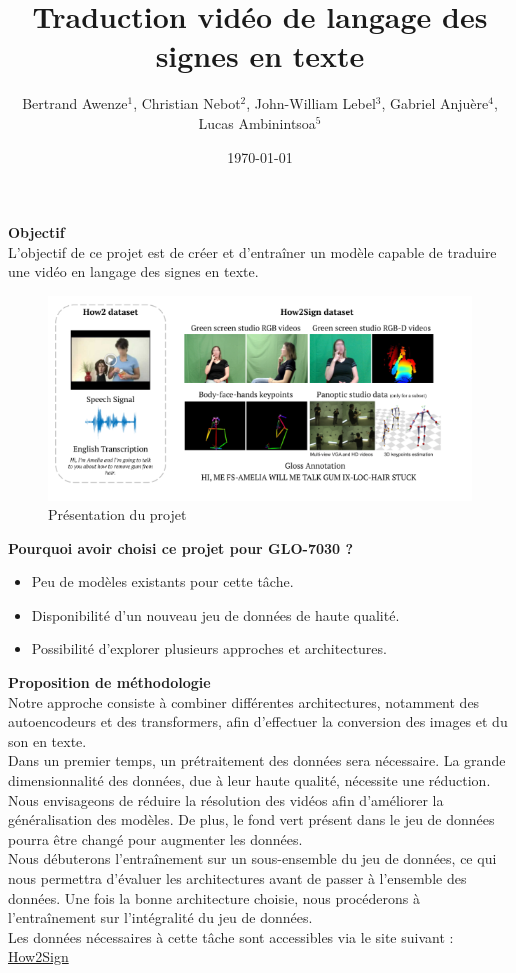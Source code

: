 \documentclass{article}
\title{\textbf{Traduction vidéo de langage des signes en texte}}
\author{
    Bertrand Awenze$^{1}$, Christian Nebot$^{2}$, John-William Lebel$^{3}$, Gabriel Anjuère$^{4}$, Lucas Ambinintsoa$^{5}$
}
\affil[ ]{$^{1,3}$ GLO-4030 \quad $^{2,4,5}$ GLO-7030}
\date{\today}
\begin{document}
\maketitle

\noindent
\textbf{Objectif} \\

L’objectif de ce projet est de créer et d’entraîner un modèle capable de traduire une vidéo en langage des signes en texte.\\ 

\begin{figure}[h]
    \centering
    \includegraphics[width=1\textwidth]{img/image.png}
    \caption{Présentation du projet}
\end{figure}

\noindent
\textbf{Pourquoi avoir choisi ce projet pour GLO-7030 ?} \\
\begin{itemize}
    \item Peu de modèles existants pour cette tâche.
    \item Disponibilité d’un nouveau jeu de données de haute qualité.
    \item Possibilité d’explorer plusieurs approches et architectures.
\end{itemize}

\noindent
\textbf{Proposition de méthodologie} \\

Notre approche consiste à combiner différentes architectures, notamment des autoencodeurs et des transformers, afin d’effectuer la conversion des images et du son en texte. \\

Dans un premier temps, un prétraitement des données sera nécessaire. La grande dimensionnalité des données, due à leur haute qualité, nécessite une réduction. Nous envisageons de réduire la résolution des vidéos afin d’améliorer la généralisation des modèles. 
De plus, le fond vert présent dans le jeu de données pourra être changé pour augmenter les données. \\

Nous débuterons l’entraînement sur un sous-ensemble du jeu de données, ce qui nous permettra d'évaluer les architectures avant de passer à l’ensemble des données. 
Une fois la bonne architecture choisie, nous procéderons à l’entraînement sur l’intégralité du jeu de données.\\

Les données nécessaires à cette tâche sont accessibles via le site suivant :  
\href{https://how2sign.github.io/}{How2Sign}
\end{document}
